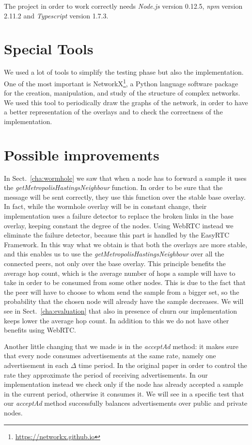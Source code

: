 The project in order to work correctly needs \textit{Node.js} version 0.12.5, \textit{npm} version 2.11.2 and \textit{Typescript} version 1.7.3.

\section{Special Tools}
We used a lot of tools to simplify the testing phase but also the implementation. One of the most important is NetworkX\footnote{\url{https://networkx.github.io}}, a Python language software package for the creation, manipulation, and study of the structure of complex networks. We used this tool to periodically draw the graphs of the network, in order to have a better representation of the overlays and to check the correctness of the implementation. 


\section{Possible improvements}
\label{sec:improvements}
In Sect.~\ref{cha:wormhole} we saw that when a node has to forward a sample it uses the \textit{getMetropolisHastingsNeighbour} function. In order to be sure that the message will be sent correctly, they use this function over the stable base overlay. In fact, while the wormhole overlay will be in constant change, their implementation uses a failure detector to replace the broken links in the base overlay, keeping constant the degree of the nodes. Using WebRTC instead we eliminate the failure detector, because this part is handled by the EasyRTC Framework. In this way what we obtain is that both the overlays are more stable, and this enables us to use the \textit{getMetropolisHastingsNeighbour} over all the connected peers, not only over the base overlay. This principle benefits the average hop count, which is the average number of hops a sample will have to take in order to be consumed from some other nodes. This is due to the fact that the peer will have to choose to whom send the sample from a bigger set, so the probability that the chosen node will already have the sample decreases. We will see in Sect.~\ref{cha:evaluation} that also in presence of churn our implementation keeps lower the average hop count. In addition to this we do not have other benefits using WebRTC. 

Another little changing that we made is in the \textit{acceptAd} method: it makes sure that every node consumes advertisements at the same rate, namely one advertisement in each $\Delta$ time period. In the original paper in order to control the rate they approximate the period of receiving advertisements. In our implementation instead we check only if the node has already accepted a sample in the current period, otherwise it consumes it. We will see in a specific test that our \textit{acceptAd} method successfully balances advertisements over public and private nodes.
